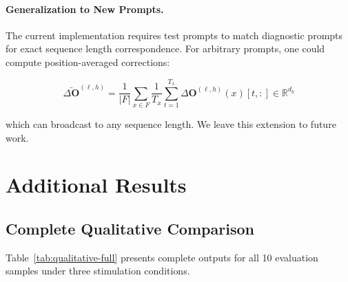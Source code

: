 \paragraph{Generalization to New Prompts.}
The current implementation requires test prompts to match diagnostic prompts 
for exact sequence length correspondence. For arbitrary prompts, one could 
compute position-averaged corrections:

\begin{equation}
\bar{\Delta\mathbf{O}}^{(\ell,h)} = 
\frac{1}{|F|} \sum_{x \in F} \frac{1}{T_x} \sum_{t=1}^{T_x} 
\Delta\mathbf{O}^{(\ell,h)}(x)[t, :] \in \mathbb{R}^{d_h}
\end{equation}

which can broadcast to any sequence length. We leave this extension to future work.

\section{Additional Results}
\label{app:additional-results}

\subsection{Complete Qualitative Comparison}
\label{app:qualitative-table}

Table~\ref{tab:qualitative-full} presents complete outputs for all 10 evaluation 
samples under three stimulation conditions.

